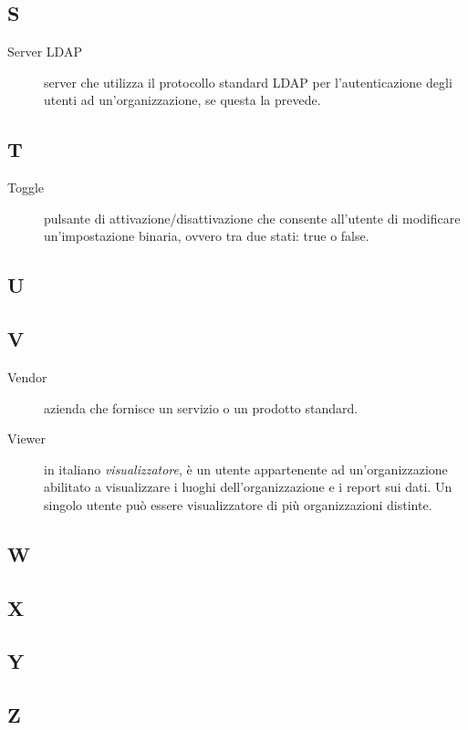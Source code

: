 \documentclass[../manuale-utente.tex]{subfiles}
\begin{document}
\subsection{S}
\begin{description}
    \item[Server LDAP] server che utilizza il protocollo standard LDAP per l'autenticazione degli utenti ad un'organizzazione, se questa la prevede.
\end{description}

\subsection{T}
\begin{description}
  \item[Toggle] pulsante di attivazione/disattivazione che consente all'utente di modificare un'impostazione binaria, ovvero tra due stati: true o false.
\end{description}

\subsection{U}

\subsection{V}
\begin{description}
    \item[Vendor] azienda che fornisce un servizio o un prodotto standard.
    \item[Viewer] in italiano \textit{visualizzatore}, è un utente appartenente ad un'organizzazione abilitato a visualizzare i luoghi dell'organizzazione e i report sui dati. Un singolo utente può essere visualizzatore di più organizzazioni distinte.
\end{description}

\subsection{W}

\subsection{X}

\subsection{Y}

\subsection{Z}
\end{document}
